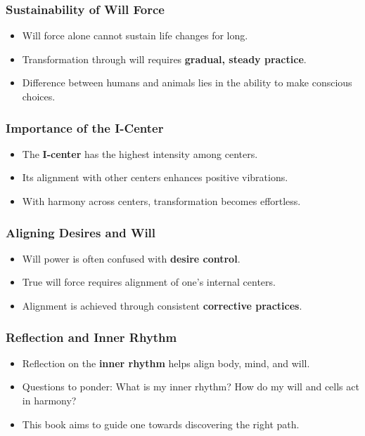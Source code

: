 \begin{frame}[fragile]\frametitle{Sustainability of Will Force}
    \begin{itemize}
        \item Will force alone cannot sustain life changes for long.
        \item Transformation through will requires \textbf{gradual, steady practice}.
        \item Difference between humans and animals lies in the ability to make conscious choices.
    \end{itemize}
\end{frame}

\begin{frame}[fragile]\frametitle{Importance of the I-Center}
    \begin{itemize}
        \item The \textbf{I-center} has the highest intensity among centers.
        \item Its alignment with other centers enhances positive vibrations.
        \item With harmony across centers, transformation becomes effortless.
    \end{itemize}
\end{frame}

\begin{frame}[fragile]\frametitle{Aligning Desires and Will}
    \begin{itemize}
        \item Will power is often confused with \textbf{desire control}.
        \item True will force requires alignment of one’s internal centers.
        \item Alignment is achieved through consistent \textbf{corrective practices}.
    \end{itemize}
\end{frame}

\begin{frame}[fragile]\frametitle{Reflection and Inner Rhythm}
    \begin{itemize}
        \item Reflection on the \textbf{inner rhythm} helps align body, mind, and will.
        \item Questions to ponder: What is my inner rhythm? How do my will and cells act in harmony?
        \item This book aims to guide one towards discovering the right path.
    \end{itemize}
\end{frame}


